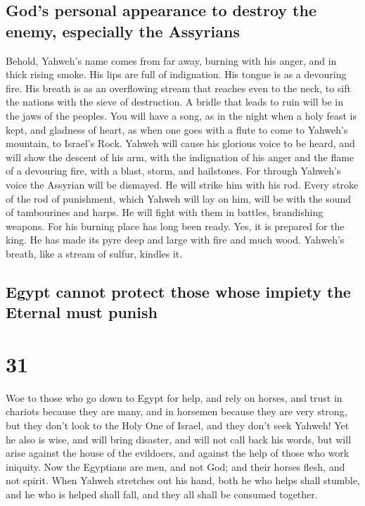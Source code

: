 \hypertarget{gods-personal-appearance-to-destroy-the-enemy-especially-the-assyrians}{%
\subsection{God's personal appearance to destroy the enemy, especially
the
Assyrians}\label{gods-personal-appearance-to-destroy-the-enemy-especially-the-assyrians}}

 Behold, Yahweh's name comes from far away, burning with
his anger, and in thick rising smoke. His lips are full of indignation.
His tongue is as a devouring fire.  His breath is as an
overflowing stream that reaches even to the neck, to sift the nations
with the sieve of destruction. A bridle that leads to ruin will be in
the jaws of the peoples.  You will have a song, as in the
night when a holy feast is kept, and gladness of heart, as when one goes
with a flute to come to Yahweh's mountain, to Israel's Rock.
 Yahweh will cause his glorious voice to be heard, and
will show the descent of his arm, with the indignation of his anger and
the flame of a devouring fire, with a blast, storm, and hailstones.
 For through Yahweh's voice the Assyrian will be
dismayed. He will strike him with his rod.  Every stroke
of the rod of punishment, which Yahweh will lay on him, will be with the
sound of tambourines and harps. He will fight with them in battles,
brandishing weapons.  For his burning place has long been
ready. Yes, it is prepared for the king. He has made its pyre deep and
large with fire and much wood. Yahweh's breath, like a stream of sulfur,
kindles it.

\hypertarget{egypt-cannot-protect-those-whose-impiety-the-eternal-must-punish}{%
\subsection{Egypt cannot protect those whose impiety the Eternal must
punish}\label{egypt-cannot-protect-those-whose-impiety-the-eternal-must-punish}}

\hypertarget{section-30}{%
\section{31}\label{section-30}}

 Woe to those who go down to Egypt for help, and rely on
horses, and trust in chariots because they are many, and in horsemen
because they are very strong, but they don't look to the Holy One of
Israel, and they don't seek Yahweh!  Yet he also is wise,
and will bring disaster, and will not call back his words, but will
arise against the house of the evildoers, and against the help of those
who work iniquity.  Now the Egyptians are men, and not
God; and their horses flesh, and not spirit. When Yahweh stretches out
his hand, both he who helps shall stumble, and he who is helped shall
fall, and they all shall be consumed together.

